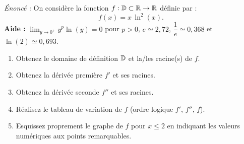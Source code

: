 \begin{exemple}
\begin{enumerate}[label=\alph*)]
\begin{center}
    \end{center}
\end{enumerate}
\end{exemple}

\begin{exemple}
\emph{Énoncé :} On considère la fonction $f : \mathbb{D} \subset \mathbb{R} \to \mathbb{R}$ définie par :
\[
    f(x) = x\,\ln^2(x).
\]
\textbf{Aide :} $\lim_{y \to 0^+} y^p\ln(y) = 0$ pour $p > 0$, $e \simeq 2,72$, $\dfrac{1}{e} \simeq 0,368$ et $\ln(2) \simeq 0,693$.
\begin{enumerate}[label=\alph*)]
    \item Obtenez le domaine de définition $\mathbb{D}$ et la/les racine(s) de $f$.
    \item Obtenez la dérivée première $f'$ et ses racines.
    \item Obtenez la dérivée seconde $f''$ et ses racines.
    \item Réalisez le tableau de variation de $f$ (ordre logique $f'$, $f''$, $f$).
    \item Esquissez proprement le graphe de $f$ pour $x \le 2$ en indiquant les valeurs numériques aux points remarquables.
\end{enumerate}


\end{exemple}
